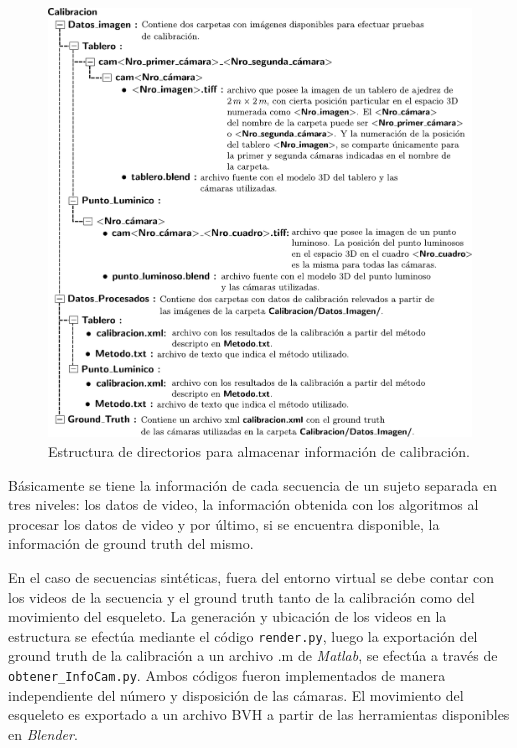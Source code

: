 \begin{figure}[ht!]
\includegraphics[scale=0.695]{img/Base_Datos/Estructura_directorios2.pdf}
\caption{Estructura de directorios para almacenar información de calibración.}
\label{Estructura_directorios2}
\end{figure}


Básicamente se tiene la información de cada secuencia de un sujeto separada en tres niveles: los datos de video, la información obtenida con los algoritmos al procesar los datos de video y por último,  si se encuentra disponible, la información de ground truth del mismo.


En el caso de secuencias sintéticas, fuera del entorno virtual se debe contar con los videos de la secuencia y el ground truth tanto de la calibración como del movimiento del esqueleto. 
La generación y ubicación de los videos en la estructura se efectúa mediante el código  \texttt{render.py}, luego la exportación del ground truth de la calibración a un archivo .m de \textit{Matlab}, se efectúa a través de \texttt{obtener\_InfoCam.py}. Ambos códigos fueron implementados de manera independiente del número y disposición de las cámaras. El movimiento del esqueleto es exportado a un archivo BVH a partir de las herramientas disponibles en \textit{Blender}.


